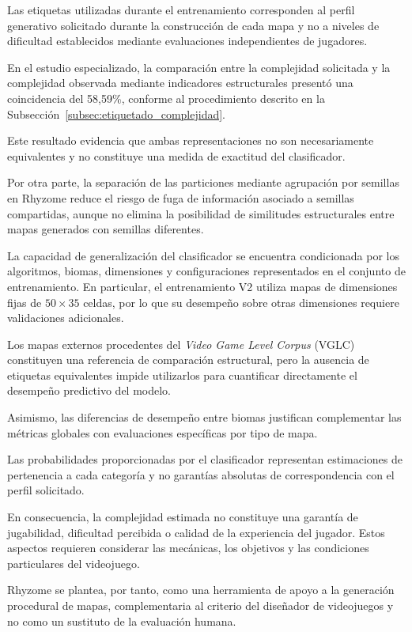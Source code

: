 Las etiquetas utilizadas durante el entrenamiento corresponden al perfil generativo solicitado durante la construcción de cada mapa y no a niveles de dificultad establecidos mediante evaluaciones independientes de jugadores.

En el estudio especializado, la comparación entre la complejidad solicitada y la complejidad observada mediante indicadores estructurales presentó una coincidencia del 58,59\%, conforme al procedimiento descrito en la Subsección~\ref{subsec:etiquetado_complejidad}.

Este resultado evidencia que ambas representaciones no son necesariamente equivalentes y no constituye una medida de exactitud del clasificador.

Por otra parte, la separación de las particiones mediante agrupación por semillas en Rhyzome reduce el riesgo de fuga de información asociado a semillas compartidas, aunque no elimina la posibilidad de similitudes estructurales entre mapas generados con semillas diferentes.

La capacidad de generalización del clasificador se encuentra condicionada por los algoritmos, biomas, dimensiones y configuraciones representados en el conjunto de entrenamiento. En particular, el entrenamiento V2 utiliza mapas de dimensiones fijas de $50 \times 35$ celdas, por lo que su desempeño sobre otras dimensiones requiere validaciones adicionales.

Los mapas externos procedentes del \textit{Video Game Level Corpus} (VGLC) constituyen una referencia de comparación estructural, pero la ausencia de etiquetas equivalentes impide utilizarlos para cuantificar directamente el desempeño predictivo del modelo.

Asimismo, las diferencias de desempeño entre biomas justifican complementar las métricas globales con evaluaciones específicas por tipo de mapa.

Las probabilidades proporcionadas por el clasificador representan estimaciones de pertenencia a cada categoría y no garantías absolutas de correspondencia con el perfil solicitado.

En consecuencia, la complejidad estimada no constituye una garantía de jugabilidad, dificultad percibida o calidad de la experiencia del jugador. Estos aspectos requieren considerar las mecánicas, los objetivos y las condiciones particulares del videojuego.

Rhyzome se plantea, por tanto, como una herramienta de apoyo a la generación procedural de mapas, complementaria al criterio del diseñador de videojuegos y no como un sustituto de la evaluación humana.

